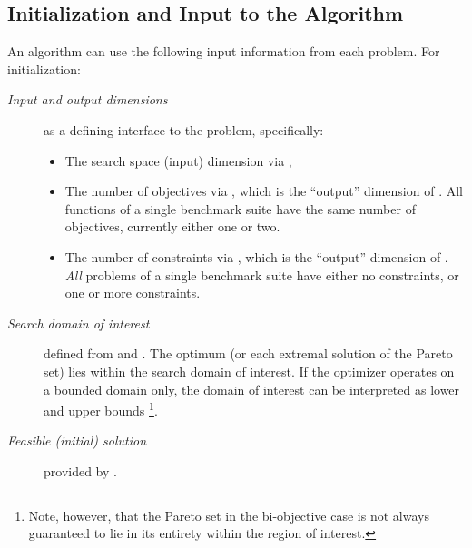 \documentclass[letterpaper,12pt,english]{article}
\begin{document}
\subsection{Initialization and Input to the Algorithm}
\label{index:initialization-and-input-to-the-algorithm}\label{index:sec-input}
An algorithm can use the following input information from each problem. For initialization:
\begin{description}
\item[{\emph{Input and output dimensions}}] \leavevmode
as a defining interface to the problem, specifically:
\begin{itemize}
\item {} 
The search space (input) dimension via \href{http://numbbo.github.io/coco-doc/C/coco\_8h.html\#a0dabf3e4f5630d08077530a1341f13ab}{},

\item {} 
The number of objectives via \href{http://numbbo.github.io/coco-doc/C/coco\_8h.html\#ab0d1fcc7f592c283f1e67cde2afeb60a}{},
which is the ``output'' dimension of \href{http://numbbo.github.io/coco-doc/C/coco\_8h.html\#aabbc02b57084ab069c37e1c27426b95c}{}.
All functions of a single benchmark suite have the same number
of objectives, currently either one or two.

\item {} 
The number of constraints via \href{http://numbbo.github.io/coco-doc/C/coco\_8h.html\#ad5c7b0889170a105671a14c8383fbb22}{},
which is the ``output'' dimension of \href{http://numbbo.github.io/coco-doc/C/coco\_8h.html\#ab5cce904e394349ec1be1bcdc35967fa}{}. \emph{All}
problems of a single benchmark suite have either no constraints, or
one or more constraints.

\end{itemize}

\item[{\emph{Search domain of interest}}] \leavevmode
defined from \href{http://numbbo.github.io/coco-doc/C/coco\_8h.html\#a29c89e039494ae8b4f8e520cba1eb154}{} and \href{http://numbbo.github.io/coco-doc/C/coco\_8h.html\#a4ea6c067adfa866b0179329fe9b7c458}{}. The optimum (or each extremal solution of the Pareto set) lies within the search domain of interest. If the optimizer operates on a bounded domain only, the domain of interest can be interpreted as lower and upper bounds \footnote[2]{
Note, however, that the Pareto set in the bi-objective case is not always guaranteed to lie in its entirety within the region of interest.
}.

\item[{\emph{Feasible (initial) solution}}] \leavevmode
provided by \href{http://numbbo.github.io/coco-doc/C/coco\_8h.html\#ac5a44845acfadd7c5cccb9900a566b32}{}.

\end{description}
\end{document}

